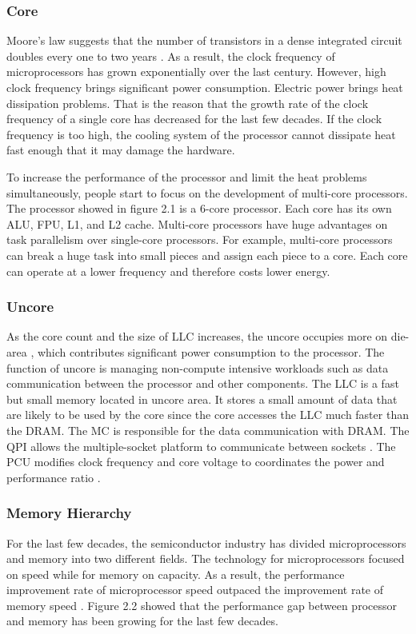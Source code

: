\subsubsection{Core}
Moore's law suggests that the number of transistors in a dense  integrated circuit doubles every one to two years \cite{39}. As a result, the clock frequency of microprocessors has grown exponentially over the last century. However, high clock frequency brings significant power consumption. Electric power brings heat dissipation problems. That is the reason that the growth rate of the clock frequency of a single core has decreased for the last few decades. If the clock frequency is too high, the cooling system of the processor cannot dissipate heat fast enough that it may damage the hardware. 

To increase the performance of the processor and limit the heat problems simultaneously, people start to focus on the development of multi-core processors. The processor showed in figure 2.1 is a 6-core processor. Each core has its own ALU, FPU, L1, and L2 cache.  Multi-core processors have huge advantages on task parallelism over single-core processors. For example, multi-core processors can break a huge task into small pieces and assign each piece to a core. Each core can operate at a lower frequency and therefore costs lower energy.
\subsubsection{Uncore}
As the core count and the size of LLC increases, the uncore occupies more on die-area \cite{17}, which contributes significant power consumption \cite{18} to the processor. The function of uncore is managing non-compute intensive workloads such as data communication between the processor and other components. The LLC is a fast but small memory located in uncore area. It stores a small amount of data that are likely to be used by the core since the core accesses the LLC much faster than the DRAM. The MC is responsible for the data communication with DRAM. The QPI allows the multiple-socket platform to communicate between sockets \cite{17}. The PCU modifies clock frequency and core voltage to coordinates the power and performance ratio \cite{17}.
\subsubsection{Memory Hierarchy}
For the last few decades, the semiconductor industry has divided microprocessors and memory into two different fields. The technology for microprocessors focused on speed while for memory on capacity. As a result, the performance improvement rate of microprocessor speed outpaced the improvement rate of memory speed \cite{10}. Figure 2.2 \cite{9} showed that the performance gap between processor and memory has been growing for the last few decades.

